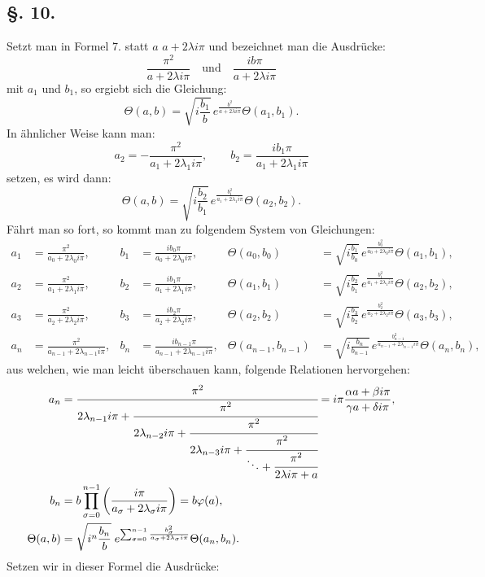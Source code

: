 \documentclass[10pt]{article}
\newcommand{\sourceanchor}[1]{\hypertarget{source-#1}{}}
\begin{document}
\subsection*{\S. 10.}
Setzt man in Formel 7. statt \(a\) \(a+2\lambda i\pi\) und bezeichnet man die Ausdrücke:
\[
\frac{\pi^{2}}{a+2\lambda i\pi}\quad\text{und}\quad \frac{ib\pi}{a+2\lambda i\pi}
\]
mit \(a_1\) und \(b_1\), so ergiebt sich die Gleichung:
\[
\Theta(a,b)=\sqrt{i\frac{b_1}{b}}\,e^{\frac{b^{2}}{a+2\lambda i\pi}}\Theta(a_1,b_1).
\]
In ähnlicher Weise kann man:
\[
a_2=-\frac{\pi^{2}}{a_1+2\lambda_1 i\pi},\qquad
b_2=\frac{i b_1\pi}{a_1+2\lambda_1 i\pi}
\]
setzen, es wird dann:
\[
\Theta(a,b)=\sqrt{i\frac{b_2}{b_1}}\,e^{\frac{b_1^{2}}{a_1+2\lambda_1 i\pi}}\Theta(a_2,b_2).
\]
Fährt man so fort, so kommt man zu folgendem System von Gleichungen:
\begin{align*}
a_1&=\frac{\pi^{2}}{a_0+2\lambda_0 i\pi},&
 b_1&=\frac{i b_0\pi}{a_0+2\lambda_0 i\pi},&
 \Theta(a_0,b_0)&=\sqrt{i\frac{b_1}{b_0}}\,e^{\frac{b_0^{2}}{a_0+2\lambda_0 i\pi}}\Theta(a_1,b_1),\\
a_2&=\frac{\pi^{2}}{a_1+2\lambda_1 i\pi},&
 b_2&=\frac{i b_1\pi}{a_1+2\lambda_1 i\pi},&
 \Theta(a_1,b_1)&=\sqrt{i\frac{b_2}{b_1}}\,e^{\frac{b_1^{2}}{a_1+2\lambda_1 i\pi}}\Theta(a_2,b_2),\\
a_3&=\frac{\pi^{2}}{a_2+2\lambda_2 i\pi},&
 b_3&=\frac{i b_2\pi}{a_2+2\lambda_2 i\pi},&
 \Theta(a_2,b_2)&=\sqrt{i\frac{b_3}{b_2}}\,e^{\frac{b_2^{2}}{a_2+2\lambda_2 i\pi}}\Theta(a_3,b_3),\\
a_n&=\frac{\pi^{2}}{a_{n-1}+2\lambda_{n-1}i\pi},&
 b_n&=\frac{i b_{n-1}\pi}{a_{n-1}+2\lambda_{n-1}i\pi},&
 \Theta(a_{n-1},b_{n-1})&=\sqrt{i\frac{b_n}{b_{n-1}}}\,e^{\frac{b_{n-1}^{2}}{a_{n-1}+2\lambda_{n-1}i\pi}}\Theta(a_n,b_n),
\end{align*}
aus welchen, wie man leicht überschauen kann, folgende Relationen hervorgehen:
\begin{align*}
a_n&=\cfrac{\pi^{2}}{2\lambda_{n-1}i\pi+\cfrac{\pi^{2}}{2\lambda_{n-2}i\pi+\cfrac{\pi^{2}}{2\lambda_{n-3}i\pi+\cfrac{\pi^{2}}{\ddots+\cfrac{\pi^{2}}{2\lambda i\pi+a}}}}}
    =i\pi\frac{\alpha a+\beta i\pi}{\gamma a+\delta i\pi},\\
b_n&=b\prod_{\sigma=0}^{n-1}\left(\frac{i\pi}{a_\sigma+2\lambda_\sigma i\pi}\right)=b\varphi(a),\\
\Theta(a,b)&=\sqrt{i^{n}\frac{b_n}{b}}\;e^{\sum_{\sigma=0}^{n-1}\frac{b_\sigma^{2}}{a_\sigma+2\lambda_\sigma i\pi}}\Theta(a_n,b_n).
\end{align*}
\sourceanchor{PA09}
Setzen wir in dieser Formel die Ausdrücke:
\end{document}
